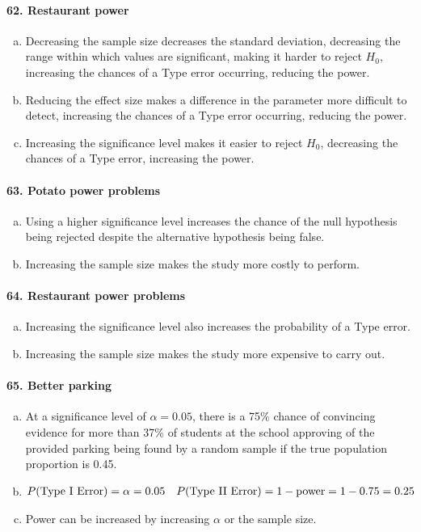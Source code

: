 			\paragraph{62. Restaurant power}
				\begin{enumerate}[a.]
					\item
						Decreasing the sample size decreases the standard deviation, decreasing the range within which values are significant, making it harder to reject $H_0$, increasing the chances of a Type  error occurring, reducing the power.
					\item
						Reducing the effect size makes a difference in the parameter more difficult to detect, increasing the chances of a Type  error occurring, reducing the power.
					\item
						Increasing the significance level makes it easier to reject $H_0$, decreasing the chances of a Type  error, increasing the power.
				\end{enumerate}
			\paragraph{63. Potato power problems}
				\begin{enumerate}[a.]
					\item
						Using a higher significance level increases the chance of the null hypothesis being rejected despite the alternative hypothesis being false.
					\item 
						Increasing the sample size makes the study more costly to perform.
				\end{enumerate}
			\paragraph{64. Restaurant power problems}
				\begin{enumerate}[a.]
					\item
						Increasing the significance level also increases the probability of a Type  error.
					\item
						Increasing the sample size makes the study more expensive to carry out.
				\end{enumerate}
			\paragraph{65. Better parking}
				\begin{enumerate}[a.]
					\item At a significance level of $\alpha = 0.05$, there is a 75\% chance of convincing evidence for more than 37\% of students at the school approving of the provided parking being found by a random sample if the true population proportion is 0.45.
					\item
						\begin{align*}
							P(\text{Type \Roman{1} Error}) &= \alpha = 0.05 & P(\text{Type \Roman{2} Error}) = 1 - \mathrm{power} = 1 - 0.75 = 0.25
						\end{align*}
					\item Power can be increased by increasing $\alpha$ or the sample size.
				\end{enumerate}
